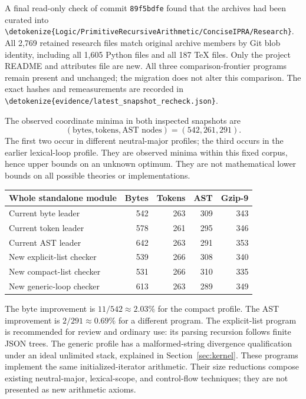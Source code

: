 \documentclass[11pt]{article}
\theoremstyle{definition}\newtheorem{definition}[theorem]{Definition}
\newcommand{\file}[1]{\expandafter\nolinkurl\expandafter{\detokenize{#1}}}
\begin{document}
A final read-only check of commit \texttt{89f5bdfe} found that the
archives had been curated into
\file{Logic/PrimitiveRecursiveArithmetic/ConciseIPRA/Research}.
All 2,769 retained research files match original archive members by Git
blob identity, including all 1,605 Python files and all 187 TeX files.
Only the project README and attributes file are new. All three
comparison-frontier programs remain present and unchanged; the migration
does not alter this comparison.\cite{maintained}
The exact hashes and remeasurements are recorded in
\file{evidence/latest_snapshot_recheck.json}.

The observed coordinate minima in both inspected snapshots are
\[
  (\text{bytes},\text{tokens},\text{AST nodes})=(542,261,291).
\]
The first two occur in different neutral-major profiles; the third occurs
in the earlier lexical-loop profile.\cite{neutral,selfseed}
They are observed minima within this fixed corpus, hence upper bounds on
an unknown optimum. They are not mathematical lower bounds on all possible
theories or implementations.

\begin{center}\small
\begin{tabular}{lrrrr}
\toprule
Whole standalone module & Bytes & Tokens & AST & Gzip-9\\
\midrule
Current byte leader &542&263&309&343\\
Current token leader &578&261&295&346\\
Current AST leader &642&263&291&353\\
\midrule
New explicit-list checker &539&266&308&340\\
New compact-list checker &531&266&310&335\\
New generic-loop checker &613&263&289&349\\
\bottomrule
\end{tabular}
\end{center}
The byte improvement is $11/542\approx2.03\%$ for the compact profile.
The AST improvement is $2/291\approx0.69\%$ for a different program.
The explicit-list program is recommended for review and ordinary use:
its parsing recursion follows finite JSON trees. The generic profile
has a malformed-string divergence qualification under an ideal unlimited
stack, explained in Section~\ref{sec:kernel}. These programs implement
the same initialized-iterator arithmetic. Their size reductions compose
existing neutral-major, lexical-scope, and control-flow techniques;
they are not presented as new arithmetic axioms.
\end{document}
